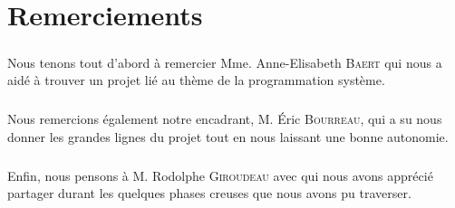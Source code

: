 \chapter*{Remerciements}
\thispagestyle{empty}

\paragraph{}Nous tenons tout d'abord à remercier Mme. Anne-Elisabeth \textsc{Baert} qui nous a aidé à trouver un projet lié au thème de la programmation système.

\paragraph{}Nous remercions également notre encadrant, M. Éric \textsc{Bourreau}, qui a su nous donner les grandes lignes du projet tout en nous laissant une bonne autonomie.


\paragraph{}Enfin, nous pensons à M. Rodolphe \textsc{Giroudeau} avec qui nous avons apprécié partager durant les quelques phases creuses que nous avons pu traverser.
